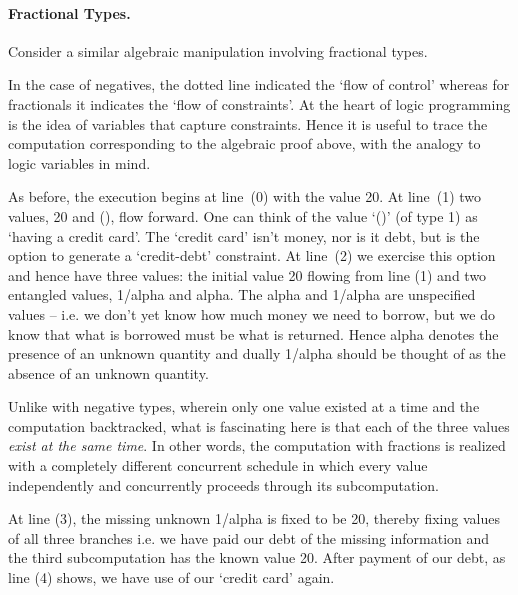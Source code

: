 \documentclass[preprint]{sigplanconf}
\begin{document}
\paragraph*{Fractional Types.} 
Consider a similar algebraic manipulation involving fractional types.
\begin{center}
\end{center}
In the case of negatives, the dotted line indicated the `flow of
control' whereas for fractionals it indicates the `flow of
constraints'. At the heart of logic programming is the idea of
variables that capture constraints. Hence it is useful to trace the
computation corresponding to the algebraic proof above, with the
analogy to logic variables in mind.

As before, the execution begins at line~(0) with the value {{20}}. At
line~(1) two values, {{20}} and {{()}}, flow forward. One can think of
the value `{{()}}' (of type {{1}}) as `having a credit card'. The
`credit card' isn't money, nor is it debt, but is the option to
generate a `credit-debt' constraint.  At line~(2) we exercise this
option and hence have three values: the initial value {{20}} flowing
from line (1) and two entangled values, {{1/alpha}} and {{alpha}}. The
{{alpha}} and {{1/alpha}} are unspecified values -- i.e. we don't yet
know how much money we need to borrow, but we do know that what is
borrowed must be what is returned. Hence {{alpha}} denotes the
presence of an unknown quantity and dually {{1/alpha}} should be
thought of as the absence of an unknown quantity.

Unlike with negative types, wherein only one value existed at a time
and the computation backtracked, what is fascinating here is that each
of the three values \emph{exist at the same time}. In other words, the
computation with fractions is realized with a completely different
concurrent schedule in which every value independently and
concurrently proceeds through its subcomputation.

At line (3), the missing unknown {{1/alpha}} is fixed to be {{20}},
thereby fixing values of all three branches i.e. we have paid our debt
of the missing information and the third subcomputation has the known
value {{20}}. After payment of our debt, as line (4) shows, we have
use of our `credit card' again.
\end{document}

